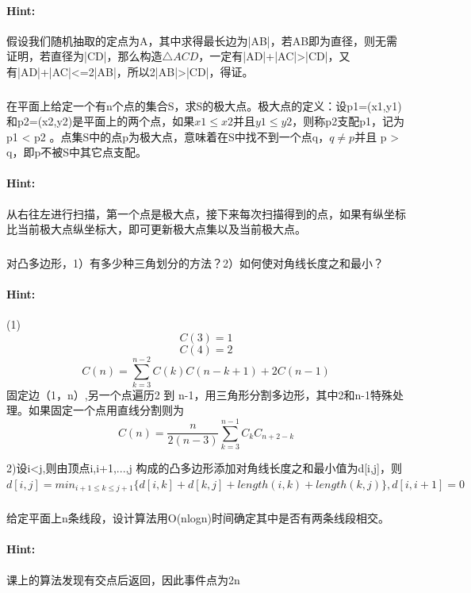 \documentclass{article}
\begin{document}
     \paragraph{Hint:}假设我们随机抽取的定点为A，其中求得最长边为|AB|，若AB即为直径，则无需证明，若直径为|CD|，那么构造$\triangle ACD$，一定有|AD|+|AC|>|CD|，又有|AD|+|AC|<=2|AB|，所以2|AB|>|CD|，得证。
     
     \subsubsection{}在平面上给定一个有n个点的集合S，求S的极大点。极大点的定义：设p1=(x1,y1)和p2=(x2,y2)是平面上的两个点，如果$x1 \leq x2$并且$y1 \leq y2$，则称p2支配p1，记为p1 < p2 。点集S中的点p为极大点，意味着在S中找不到一个点q，$q \ne p$并且 p > q，即p不被S中其它点支配。
     \paragraph{Hint:}从右往左进行扫描，第一个点是极大点，接下来每次扫描得到的点，如果有纵坐标比当前极大点纵坐标大，即可更新极大点集以及当前极大点。
     
     \subsubsection{}对凸多边形，1）有多少种三角划分的方法？2）如何使对角线长度之和最小？
     \paragraph{Hint:}(1)
    \[ C(3) = 1 \]
    \[ C(4) = 2\]
     \[
        C(n) = \sum ^{n-2}_{k=3}C(k)C(n-k+1)+2C(n-1)
        \]     
  固定边（1，n）,另一个点遍历2 到 n-1，用三角形分割多边形，其中2和n-1特殊处理。如果固定一个点用直线分割则为\[
            C(n)=\frac{n}{2(n-3)}\sum ^{n-1}_{k=3} C_{k}C_{n+2-k}
        \]
        
        2)设i<j,则由顶点i,i+1,...,j 构成的凸多边形添加对角线长度之和最小值为d[i,j]，则$d[i,j]=min_{i+1\leq k \leq j+1} \{d[i,k]+d[k,j]+length(i,k)+length(k,j)\} , d[i,i+1]=0 $
        
     \subsubsection{}给定平面上n条线段，设计算法用O(nlogn)时间确定其中是否有两条线段相交。
     \paragraph{Hint:}课上的算法发现有交点后返回，因此事件点为2n
     
\end{document}
